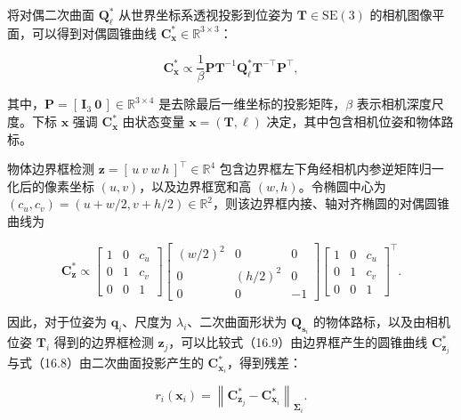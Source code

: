 将对偶二次曲面 $\boldsymbol{Q}_{\boldsymbol{\ell}}^{*}$ 从世界坐标系透视投影到位姿为 $\boldsymbol{T}\in\mathrm{SE}(3)$ 的相机图像平面，可以得到对偶圆锥曲线 $\boldsymbol{C}_{\boldsymbol{x}}^{*}\in\mathbb{R}^{3\times3}$：

\begin{equation}
\boldsymbol{C}_{\boldsymbol{x}}^{*}\propto
\frac{1}{\beta}\boldsymbol{P}\boldsymbol{T}^{-1}\boldsymbol{Q}_{\boldsymbol{\ell}}^{*}
\boldsymbol{T}^{-\top}\boldsymbol{P}^{\top},\tag{16.8}
\end{equation}

其中，$\boldsymbol{P}=[\,\boldsymbol{I}_3\ \boldsymbol{0}\,]\in\mathbb{R}^{3\times4}$ 是去除最后一维坐标的投影矩阵，$\beta$ 表示相机深度尺度。下标 $\boldsymbol{x}$ 强调 $\boldsymbol{C}_{\boldsymbol{x}}^{*}$ 由状态变量 $\boldsymbol{x}=(\boldsymbol{T},\boldsymbol{\ell})$ 决定，其中包含相机位姿和物体路标。

物体边界框检测 $\boldsymbol{z}=[\,u\ v\ w\ h\,]^{\top}\in\mathbb{R}^{4}$ 包含边界框左下角经相机内参逆矩阵归一化后的像素坐标 $(u,v)$，以及边界框宽和高 $(w,h)$。令椭圆中心为 $(c_u,c_v)=(u+w/2,v+h/2)\in\mathbb{R}^{2}$，则该边界框内接、轴对齐椭圆的对偶圆锥曲线为

\begin{equation}
\boldsymbol{C}_{\boldsymbol{z}}^{*}\propto
\begin{bmatrix}1&0&c_u\\0&1&c_v\\0&0&1\end{bmatrix}
\begin{bmatrix}(w/2)^2&0&0\\0&(h/2)^2&0\\0&0&-1\end{bmatrix}
\begin{bmatrix}1&0&c_u\\0&1&c_v\\0&0&1\end{bmatrix}^{\top}.\tag{16.9}
\end{equation}

因此，对于位姿为 $\boldsymbol{q}_i$、尺度为 $\lambda_i$、二次曲面形状为 $\boldsymbol{Q}_{\boldsymbol{s}_i}$ 的物体路标，以及由相机位姿 $\boldsymbol{T}_i$ 得到的边界框检测 $\boldsymbol{z}_j$，可以比较式（16.9）由边界框产生的圆锥曲线 $\boldsymbol{C}_{\boldsymbol{z}_j}^{*}$ 与式（16.8）由二次曲面投影产生的 $\boldsymbol{C}_{\boldsymbol{x}_i}^{*}$，得到残差：

\begin{equation}
r_i(\boldsymbol{x}_i)=\left\|\boldsymbol{C}_{\boldsymbol{z}_j}^{*}-\boldsymbol{C}_{\boldsymbol{x}_i}^{*}\right\|_{\boldsymbol{\Sigma}_i}.\tag{16.10}
\end{equation}

